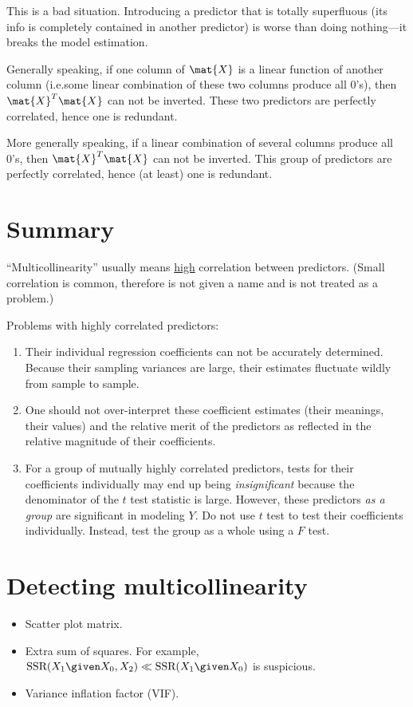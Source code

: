 \documentclass[12pt]{article}
\newcommand{\SSR}{\text{SSR}}
\begin{document}
This is a bad situation.
Introducing a predictor that is totally superfluous
(its info is completely contained in another predictor)
is worse than doing nothing---it breaks the model estimation.

Generally speaking,
if one column of $\mat{X}$ is a linear function of another column
(i.e.\@ some linear combination of these two columns produce all 0's),
then $\mat{X}^T\mat{X}$ can not be inverted.
These two predictors are perfectly correlated,
hence one is redundant.

More generally speaking,
if a linear combination of several columns produce all 0's,
then $\mat{X}^T\mat{X}$ can not be inverted.
This group of predictors are perfectly correlated,
hence (at least) one is redundant.

\section{Summary}

``Multicollinearity'' usually means \underline{high}
correlation between predictors.
(Small correlation is common, therefore is not given a name and
is not treated as a problem.)

Problems with highly correlated predictors:
\begin{enumerate}
\item Their individual regression coefficients can not be accurately
determined.
Because their sampling variances are large,
their estimates fluctuate wildly from sample to sample.
\item One should not over-interpret these coefficient estimates
(their meanings, their values)
and the relative merit of the predictors as reflected in
the relative magnitude of their coefficients.
\item For a group of mutually highly correlated predictors,
tests for their coefficients individually may end up being
\emph{insignificant} because the denominator of the $t$ test statistic is large.
However, these predictors \emph{as a group} are significant in modeling $Y$.
Do not use $t$ test to test their coefficients individually.
Instead, test the group as a whole using a $F$ test.
\end{enumerate}


\section{Detecting multicollinearity}

\begin{itemize}
\item Scatter plot matrix.
\item Extra sum of squares.
For example, $\SSR(X_1 \given X_0, X_2) \ll \SSR(X_1 \given X_0)$
is suspicious.
\item Variance inflation factor (VIF).
\end{itemize}
\end{document}
